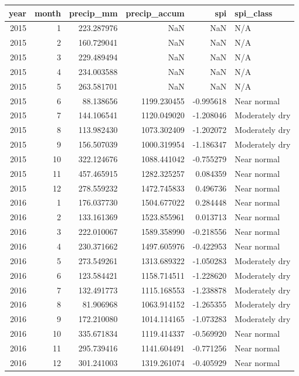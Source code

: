 \begin{tabular}{rrrrrl}
\toprule
year & month & precip\_mm & precip\_accum & spi & spi\_class \\
\midrule
2015 & 1 & 223.287976 & NaN & NaN & N/A \\
2015 & 2 & 160.729041 & NaN & NaN & N/A \\
2015 & 3 & 229.489494 & NaN & NaN & N/A \\
2015 & 4 & 234.003588 & NaN & NaN & N/A \\
2015 & 5 & 263.581701 & NaN & NaN & N/A \\
2015 & 6 & 88.138656 & 1199.230455 & -0.995618 & Near normal \\
2015 & 7 & 144.106541 & 1120.049020 & -1.208046 & Moderately dry \\
2015 & 8 & 113.982430 & 1073.302409 & -1.202072 & Moderately dry \\
2015 & 9 & 156.507039 & 1000.319954 & -1.186347 & Moderately dry \\
2015 & 10 & 322.124676 & 1088.441042 & -0.755279 & Near normal \\
2015 & 11 & 457.465915 & 1282.325257 & 0.084359 & Near normal \\
2015 & 12 & 278.559232 & 1472.745833 & 0.496736 & Near normal \\
2016 & 1 & 176.037730 & 1504.677022 & 0.284448 & Near normal \\
2016 & 2 & 133.161369 & 1523.855961 & 0.013713 & Near normal \\
2016 & 3 & 222.010067 & 1589.358990 & -0.218556 & Near normal \\
2016 & 4 & 230.371662 & 1497.605976 & -0.422953 & Near normal \\
2016 & 5 & 273.549261 & 1313.689322 & -1.050283 & Moderately dry \\
2016 & 6 & 123.584421 & 1158.714511 & -1.228620 & Moderately dry \\
2016 & 7 & 132.491773 & 1115.168553 & -1.238878 & Moderately dry \\
2016 & 8 & 81.906968 & 1063.914152 & -1.265355 & Moderately dry \\
2016 & 9 & 172.210080 & 1014.114165 & -1.073283 & Moderately dry \\
2016 & 10 & 335.671834 & 1119.414337 & -0.569920 & Near normal \\
2016 & 11 & 295.739416 & 1141.604491 & -0.771256 & Near normal \\
2016 & 12 & 301.241003 & 1319.261074 & -0.405929 & Near normal \\

\end{tabular}
